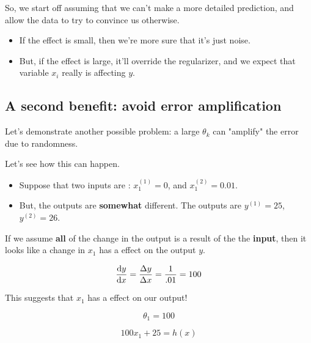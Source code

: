        So, we start off assuming that we can't make a more detailed prediction, and allow the data to try to convince us otherwise.

        \begin{itemize}
            \item If the effect is small, then we're more sure that it's just noise. 
            \item But, if the effect is large, it'll override the regularizer, and we expect that variable $x_i$ really is affecting $y$.
        \end{itemize}


    \subsection{A second benefit: avoid error amplification}

        Let's demonstrate another possible problem: a large $\theta_k$ can "amplify" the error due to randomness.

        Let's see how this can happen.

        \begin{itemize}
            \item Suppose that two inputs are : $x_1^{(1)}=0$, and $x_1^{(2)}=0.01$. 
                
            \item But, the outputs are \textbf{somewhat} different.  The outputs are $y^{(1)}=25$, $y^{(2)}=26$.
        \end{itemize}
        
        If we assume \textbf{all} of the change in the output is a result of the the \textbf{input}, then it looks like a  change in $x_1$ has a  effect on the output $y$.

        \begin{equation}
            \frac{\dd y}{\dd x} = \frac{\Delta y}{\Delta x} = \frac{1}{.01} = 100
        \end{equation}

        This suggests that $x_1$ has a  effect on our output! 

        \begin{equation}
            \theta_1 = 100
        \end{equation}

        \begin{equation}
            100 x_1 + 25 = h(x)
        \end{equation}

